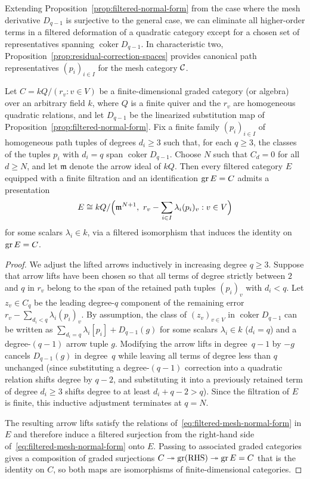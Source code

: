 Extending Proposition~\ref{prop:filtered-normal-form} from the case where the mesh derivative $D_{q-1}$ is surjective to the general case, we can eliminate all higher-order terms in a filtered deformation of a quadratic category except for a chosen set of representatives spanning $\operatorname{coker}D_{q-1}$. In characteristic two, Proposition~\ref{prop:residual-correction-spaces} provides canonical path representatives $(p_i)_{i\in I}$ for the mesh category $\mathcal C$.

\begin{proposition}
\label{prop:characteristic-two-normal-form}
Let $C=kQ/(r_v:v\in V)$ be a finite-dimensional graded category (or algebra) over an arbitrary field $k$, where $Q$ is a finite quiver and the $r_v$ are homogeneous quadratic relations, and let $D_{q-1}$ be the linearized substitution map of Proposition~\ref{prop:filtered-normal-form}. Fix a finite family $(p_i)_{i\in I}$ of homogeneous path tuples of degrees $d_i\geq3$ such that, for each $q\geq3$, the classes of the tuples $p_i$ with $d_i=q$ span $\operatorname{coker}D_{q-1}$. Choose $N$ such that $C_d=0$ for all $d\geq N$, and let $\mathfrak m$ denote the arrow ideal of $kQ$. Then every filtered category $E$ equipped with a finite filtration and an identification $\operatorname{gr} E=C$ admits a presentation
\begin{equation}
  E\cong kQ/\Bigl(\mathfrak m^{N+1},\ r_v-\sum_{i\in I}\lambda_i(p_i)_v:v\in V\Bigr)
  \label{eq:filtered-mesh-normal-form}
\end{equation}
for some scalars $\lambda_i\in k$, via a filtered isomorphism that induces the identity on $\operatorname{gr} E=C$.
\end{proposition}
\begin{proof}
We adjust the lifted arrows inductively in increasing degree $q\geq3$. Suppose that arrow lifts have been chosen so that all terms of degree strictly between $2$ and $q$ in $r_v$ belong to the span of the retained path tuples $(p_i)_v$ with $d_i<q$. Let $z_v\in C_q$ be the leading degree-$q$ component of the remaining error $r_v-\sum_{d_i<q}\lambda_i(p_i)_v$. By assumption, the class of $(z_v)_{v\in V}$ in $\operatorname{coker}D_{q-1}$ can be written as $\sum_{d_i=q}\lambda_i[p_i]+D_{q-1}(g)$ for some scalars $\lambda_i\in k$ ($d_i=q$) and a degree-$(q-1)$ arrow tuple $g$. Modifying the arrow lifts in degree~$q-1$ by $-g$ cancels $D_{q-1}(g)$ in degree~$q$ while leaving all terms of degree less than $q$ unchanged (since substituting a degree-$(q-1)$ correction into a quadratic relation shifts degree by $q-2$, and substituting it into a previously retained term of degree $d_i\geq3$ shifts degree to at least $d_i+q-2>q$). Since the filtration of $E$ is finite, this inductive adjustment terminates at $q=N$.

The resulting arrow lifts satisfy the relations of~\eqref{eq:filtered-mesh-normal-form} in $E$ and therefore induce a filtered surjection from the right-hand side of~\eqref{eq:filtered-mesh-normal-form} onto $E$. Passing to associated graded categories gives a composition of graded surjections $C\twoheadrightarrow\operatorname{gr}(\text{RHS})\twoheadrightarrow\operatorname{gr} E=C$ that is the identity on $C$, so both maps are isomorphisms of finite-dimensional categories.
\end{proof}

